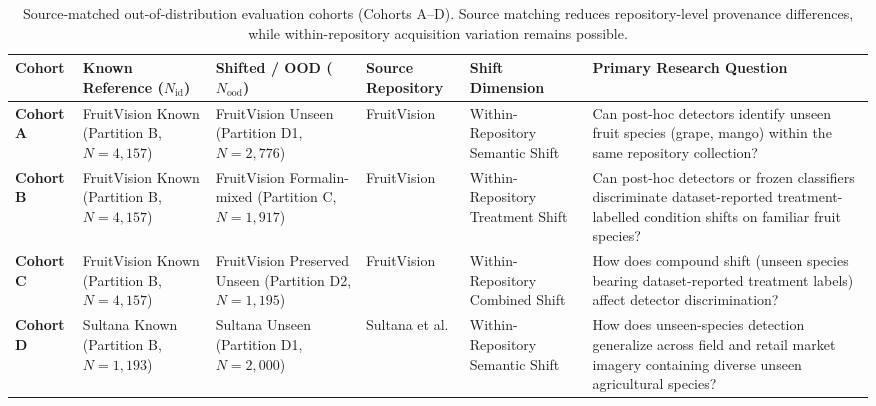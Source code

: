 \begin{table}[!t]
\caption{Source-matched out-of-distribution evaluation cohorts (Cohorts A--D). Source matching reduces repository-level provenance differences, while within-repository acquisition variation remains possible.}
\label{tab:source_matched_cohorts}
\centering
\footnotesize
\setlength{\tabcolsep}{2.5pt}
\begin{tabular}{>{\raggedright\arraybackslash}p{1.5cm} >{\raggedright\arraybackslash}p{2.6cm} >{\raggedright\arraybackslash}p{2.6cm} >{\raggedright\arraybackslash}p{2.2cm} >{\raggedright\arraybackslash}p{2.5cm} >{\raggedright\arraybackslash}p{3.4cm}}
\toprule
\textbf{Cohort} & \textbf{Known Reference ($N_{\text{id}}$)} & \textbf{Shifted / OOD ($N_{\text{ood}}$)} & \textbf{Source Repository} & \textbf{Shift Dimension} & \textbf{Primary Research Question} \\
\midrule
\textbf{Cohort A} & FruitVision Known \newline (Partition B, $N = 4,157$) & FruitVision Unseen \newline (Partition D1, $N = 2,776$) & FruitVision & Within-Repository Semantic Shift & Can post-hoc detectors identify unseen fruit species (grape, mango) within the same repository collection? \\
\addlinespace[3pt]
\textbf{Cohort B} & FruitVision Known \newline (Partition B, $N = 4,157$) & FruitVision Formalin-mixed \newline (Partition C, $N = 1,917$) & FruitVision & Within-Repository Treatment Shift & Can post-hoc detectors or frozen classifiers discriminate dataset-reported treatment-labelled condition shifts on familiar fruit species? \\
\addlinespace[3pt]
\textbf{Cohort C} & FruitVision Known \newline (Partition B, $N = 4,157$) & FruitVision Preserved Unseen \newline (Partition D2, $N = 1,195$) & FruitVision & Within-Repository Combined Shift & How does compound shift (unseen species bearing dataset-reported treatment labels) affect detector discrimination? \\
\addlinespace[3pt]
\textbf{Cohort D} & Sultana Known \newline (Partition B, $N = 1,193$) & Sultana Unseen \newline (Partition D1, $N = 2,000$) & Sultana et al. & Within-Repository Semantic Shift & How does unseen-species detection generalize across field and retail market imagery containing diverse unseen agricultural species? \\
\bottomrule
\end{tabular}
\end{table}

